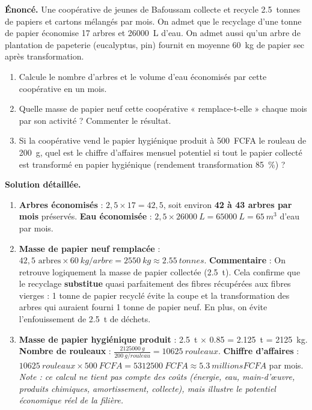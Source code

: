 \documentclass[11pt]{article}
\begin{document}
\begin{exoresolu}
\textbf{Énoncé.} Une coopérative de jeunes de Bafoussam collecte et recycle \SI{2,5}{tonnes} de papiers et cartons mélangés par mois. On admet que le recyclage d'une tonne de papier économise 17 arbres et \SI{26000}{L} d'eau. On admet aussi qu'un arbre de plantation de papeterie (eucalyptus, pin) fournit en moyenne \SI{60}{kg} de papier sec après transformation.
\begin{enumerate}
\item Calcule le nombre d'arbres et le volume d'eau économisés par cette coopérative en un mois.
\item Quelle masse de papier neuf cette coopérative « remplace-t-elle » chaque mois par son activité ? Commenter le résultat.
\item Si la coopérative vend le papier hygiénique produit à \SI{500}{FCFA} le rouleau de \SI{200}{g}, quel est le chiffre d'affaires mensuel potentiel si tout le papier collecté est transformé en papier hygiénique (rendement transformation \SI{85}{\%}) ?
\end{enumerate}
\tcblower
\textbf{Solution détaillée.}
\begin{enumerate}
\item \textbf{Arbres économisés} : ${2,5} \times 17 = 42,5$, soit environ \textbf{42 à 43 arbres par mois} préservés.
\textbf{Eau économisée} : ${2,5} \times \SI{26000}{L} = \SI{65000}{L} = \SI{65}{m^3}$ d'eau par mois.
\item \textbf{Masse de papier neuf remplacée} : $42,5 \text{ arbres} \times \SI{60}{kg/arbre} = \SI{2550}{kg} \approx \SI{2,55}{tonnes}$.
\textbf{Commentaire} : On retrouve logiquement la masse de papier collectée (\SI{2,5}{t}). Cela confirme que le recyclage \textbf{substitue} quasi parfaitement des fibres récupérées aux fibres vierges : 1 tonne de papier recyclé évite la coupe et la transformation des arbres qui auraient fourni 1 tonne de papier neuf. En plus, on évite l'enfouissement de \SI{2,5}{t} de déchets.
\item \textbf{Masse de papier hygiénique produit} : \SI{2,5}{t} $\times$ \num{0,85} = \SI{2,125}{t} = \SI{2125}{kg}.
\textbf{Nombre de rouleaux} : $\frac{\SI{2125000}{g}}{\SI{200}{g/rouleau}} = \SI{10625}{rouleaux}$.
\textbf{Chiffre d'affaires} : $\SI{10625}{rouleaux} \times \SI{500}{FCFA} = \SI{5312500}{FCFA} \approx \SI{5,3}{millions FCFA}$ par mois.
\textit{Note : ce calcul ne tient pas compte des coûts (énergie, eau, main-d'œuvre, produits chimiques, amortissement, collecte), mais illustre le potentiel économique réel de la filière.}
\end{enumerate}
\end{exoresolu}
\end{document}
